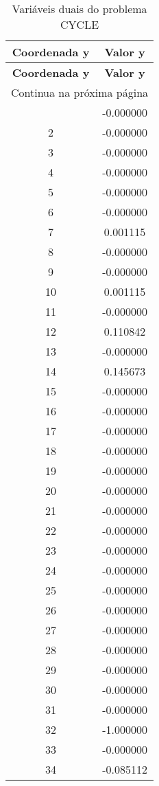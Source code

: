 \documentclass[12pt]{article}
\begin{document}
\begin{longtable}{@{}cc@{}}
\caption{Variáveis duais do problema CYCLE} \\
\toprule
\textbf{Coordenada y} & \textbf{Valor y} \\
\midrule
\endfirsthead

\toprule
\textbf{Coordenada y} & \textbf{Valor y} \\
\midrule
\endhead

\midrule \multicolumn{2}{r}{{Continua na próxima página}} \\ \midrule
\endfoot

\bottomrule
\endlastfoot
1 & -0.000000 \\
2 & -0.000000 \\
3 & -0.000000 \\
4 & -0.000000 \\
5 & -0.000000 \\
6 & -0.000000 \\
7 & 0.001115 \\
8 & -0.000000 \\
9 & -0.000000 \\
10 & 0.001115 \\
11 & -0.000000 \\
12 & 0.110842 \\
13 & -0.000000 \\
14 & 0.145673 \\
15 & -0.000000 \\
16 & -0.000000 \\
17 & -0.000000 \\
18 & -0.000000 \\
19 & -0.000000 \\
20 & -0.000000 \\
21 & -0.000000 \\
22 & -0.000000 \\
23 & -0.000000 \\
24 & -0.000000 \\
25 & -0.000000 \\
26 & -0.000000 \\
27 & -0.000000 \\
28 & -0.000000 \\
29 & -0.000000 \\
30 & -0.000000 \\
31 & -0.000000 \\
32 & -1.000000 \\
33 & -0.000000 \\
34 & -0.085112 \\

\end{longtable}
\end{document}
